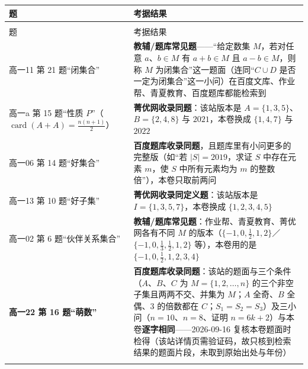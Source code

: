\documentclass[a4paper,11pt]{article}
\begin{document}
\newcommand{\tabhdrL}{\rowcolor{white} 题 & 考据结果 \\}
\begin{xltabular}{\textwidth}{@{}>{\raggedright\arraybackslash}p{6.55cm}>{\raggedright\arraybackslash}p{8.60cm}@{}}
\toprule
\tabhdrL
\midrule
\endfirsthead
{} \\
\midrule
\tabhdrL
\midrule
\endhead
\bottomrule
\endlastfoot
高一11 第 21 题``闭集合'' & \textbf{教辅/题库常见题}------``给定数集 \(M\)，若对任意 \(a\)、\(b\in M\) 有 \(a+b\in M\) 且 \(a-b\in M\)，则称 \(M\) 为闭集合''这一题面（连同``\(C\cup\allowbreak  D\) 是否一定为闭集合''这一小问）在百度文库、作业帮、青夏教育、百度题库都能检索到 \\ \addlinespace[1pt]
高一a 第 15 题``性质 \(P\)''（\(\operatorname{card}(A+A)=\allowbreak \frac{n(n+\allowbreak 1)}{2}\)） & \textbf{菁优网收录同题}：该站版本是 \(A=\allowbreak \{1,\allowbreak 3,\allowbreak 5\}\)、\(B=\allowbreak \{2,\allowbreak 4,\allowbreak 8\}\) 与 \(2021\)，本卷换成 \(\{1,\allowbreak 4,\allowbreak 7\}\) 与 \(2022\) \\ \addlinespace[1pt]
高一06 第 14 题``好集合'' & \textbf{百度题库收录同题}，且题库里有小问更多的完整版（如``若 \(\lvert S\rvert=\allowbreak 2019\)，求证 \(S\) 中存在元素 \(m\)，使 \(S\) 中所有元素均为 \(m\) 的整数倍''），本卷只取前两问 \\ \addlinespace[1pt]
高一13 第 10 题``好子集'' & \textbf{菁优网收录同定义题}：该站版本是 \(I=\allowbreak \{1,\allowbreak 3,\allowbreak 5,\allowbreak 7\}\)，本卷换成 \(\{1,\allowbreak 2,\allowbreak 3,\allowbreak 4,\allowbreak 5\}\) \\ \addlinespace[1pt]
高一02 第 6 题``伙伴关系集合'' & \textbf{教辅/题库常见题}：作业帮、青夏教育、菁优网各有不同 \(M\) 的版本（\(\{-1,\allowbreak 0,\allowbreak \frac12,\allowbreak 1,\allowbreak 2\}\)／\(\{-1,\allowbreak 0,\allowbreak \frac13,\allowbreak \frac12,\allowbreak 1,\allowbreak 2\}\) 等），本卷用的是 \(\{-1,\allowbreak 0,\allowbreak \frac12,\allowbreak 1,\allowbreak 2,\allowbreak 3,\allowbreak 4\}\) \\ \addlinespace[1pt]
\textbf{高一22 第 16 题``萌数''} & \textbf{百度题库收录同题}：该站的题面与三个条件（\(A\)、\(B\)、\(C\) 为 \(M=\allowbreak \{1,\allowbreak 2,\allowbreak \dots,n\}\) 的三个非空子集且两两不交、并集为 \(M\)；\(A\) 全奇、\(B\) 全偶、\(3\) 的倍数都在 \(C\)；\(S_1=S_2=S_3\)）及三小问（\(n=\allowbreak 10\)、\(n=\allowbreak 8\)、证明 \(n=\allowbreak 6k+\allowbreak 2\)）与本卷\textbf{逐字相同}------2026-09-16 复核本卷题面时检得（该站详情页需验证码，故只核到检索结果的题面片段，未取到原始出处与年份） \\ \addlinespace[1pt]

\end{xltabular}
\end{document}
